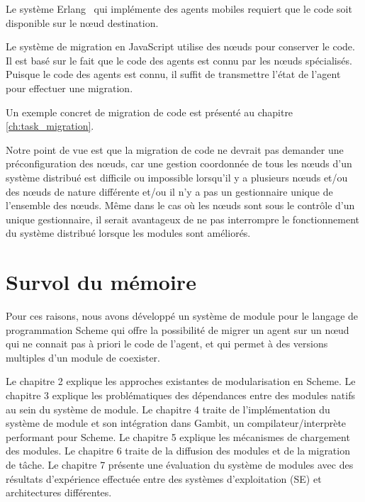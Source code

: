 Le système Erlang~\cite{M_mobileintelligent} qui implémente des agents mobiles
requiert que le code soit disponible sur le nœud destination.

Le système de migration en JavaScript utilise des nœuds pour conserver
le code. Il est basé sur le fait que le code des agents est connu par les
nœuds spécialisés. Puisque le code des agents est connu, il suffit de
transmettre l'état de l'agent pour effectuer une migration.

Un exemple concret de migration de code est présenté au chapitre
\ref{ch:task_migration}.

Notre point de vue est que la migration de code ne devrait pas
demander une préconfiguration des nœuds, car une gestion coordonnée de
tous les nœuds d'un système distribué est difficile ou impossible
lorsqu'il y a plusieurs nœuds et/ou des nœuds de nature différente
et/ou il n'y a pas un gestionnaire unique de l'ensemble des nœuds.
Même dans le cas où les nœuds sont sous le contrôle d'un unique
gestionnaire, il serait avantageux de ne pas interrompre le
fonctionnement du système distribué lorsque les modules sont
améliorés.

\section{Survol du mémoire}

Pour ces raisons, nous avons développé un système de module pour le
langage de programmation Scheme qui offre la possibilité de migrer un
agent sur un nœud qui ne connait pas à priori le code de l'agent, et
qui permet à des versions multiples d'un module de coexister.

Le chapitre 2 explique les approches existantes de modularisation en
Scheme.  Le chapitre 3 explique les problématiques des dépendances
entre des modules natifs au sein du système de module. Le chapitre 4
traite de l'implémentation du système de module et son intégration
dans Gambit, un compilateur/interprète performant pour Scheme. Le chapitre 5
explique les mécanismes de chargement des modules.  Le chapitre 6
traite de la diffusion des modules et de la migration de tâche.  Le
chapitre 7 présente une évaluation du système de modules avec des résultats
d'expérience effectuée entre des systèmes d'exploitation (SE) et
architectures différentes.



